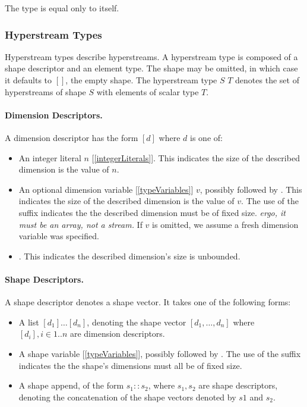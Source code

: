 \documentclass{article}
\begin{document}
The type \STRING{} is equal only to itself. 

\subsubsection{Hyperstream Types}
\label{hyperstreamTypes}

Hyperstream types describe hyperstreams. A hyperstream type is composed of a shape descriptor and an element type. The shape may be omitted, in which case it defaults to $[]$, the empty shape. The hyperstream type $S$ $T$ denotes the set of hyperstreams of shape $S$ with elements of scalar type $T$.

\paragraph{Dimension Descriptors.}
A dimension descriptor has the form $[d]$ where $d$ is one of:
\begin{itemize}
\item An integer literal $n$ [\ref{integerLiterals}]. This indicates the size of the described dimension is the value of $n$.
\item An optional dimension variable [\ref{typeVariables}] $v$, possibly followed by \BANG. This indicates the size of the described dimension is the value of $v$.
The use of the \BANG{} suffix indicates the the described  dimension must be of fixed size. 
{\em ergo, it must be an array, not a stream.}
If $v$ is omitted, we assume a fresh dimension variable was specified. 
\item  \QUESTIONMARK. This indicates the described dimension's size is unbounded.
 \end{itemize}
 
\paragraph{Shape Descriptors.}
 A shape descriptor denotes a shape vector. It takes one of the following forms:
 \begin{itemize}
 \item  A list $[d_1] \ldots [d_n]$, denoting the shape vector $[d_1, \ldots, d_n]$ where $[d_i], i \in 1..n$ are dimension descriptors.
 \item A shape variable [\ref{typeVariables}], possibly followed by \BANG. The use of the \BANG{} suffix indicates the the shape's  dimensions must all be of fixed size. 
 \item A shape append, of the form $s_1 :: s_2$, where $s_1, s_2$ are shape descriptors, denoting the concatenation of the shape vectors denoted by $s1$ and $s_2$. 
 \end{itemize}
 
\end{document}
